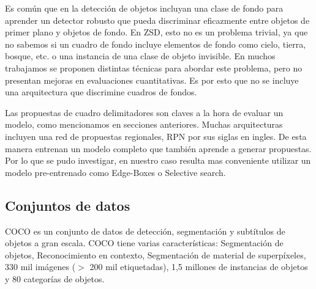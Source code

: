Es común que en la detección de objetos incluyan una clase de fondo para aprender un detector robusto que pueda discriminar eficazmente entre objetos de primer plano y objetos de fondo. En ZSD, esto no es un problema trivial, ya que no sabemos si un cuadro de fondo incluye elementos de fondo como cielo, tierra, bosque, etc. o una instancia de una clase de objeto invisible. En muchos trabajamos se proponen distintas técnicas para abordar este problema, pero no presentan mejoras en evaluaciones cuantitativas. Es por esto que no se incluye una arquitectura que discrimine cuadros de fondos.

Las propuestas de cuadro delimitadores son claves a la hora de evaluar un modelo, como mencionamos en secciones anteriores.  Muchas arquitecturas incluyen una red de propuestas regionales, RPN por sus siglas en ingles. De esta manera entrenan un modelo completo que también aprende a generar propuestas. Por lo que se pudo investigar, en nuestro caso resulta mas conveniente utilizar un modelo pre-entrenado como Edge-Boxes o Selective search.

\subsection{Conjuntos de datos} \label{ssec:conjuntosdedatos}
COCO es un conjunto de datos de detección, segmentación y subtítulos de objetos a gran escala. COCO tiene varias características: Segmentación de objetos,  Reconocimiento en contexto,  Segmentación de material de superpíxeles, 330 mil imágenes ($>$ 200 mil etiquetadas), 1,5 millones de instancias de objetos y 80 categorías de objetos.

